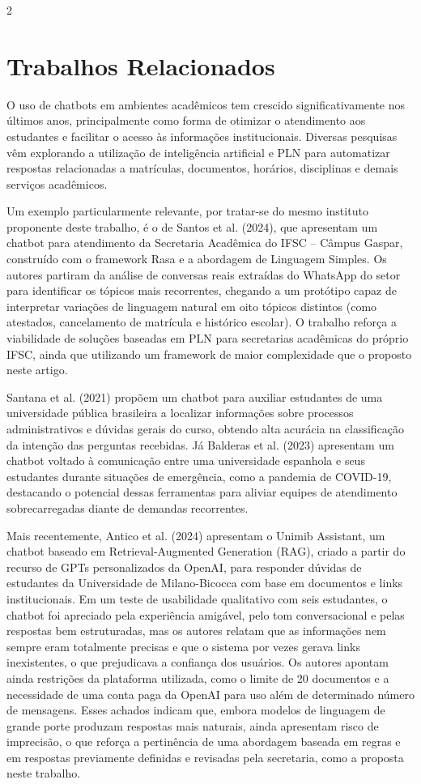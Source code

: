 \documentclass[10pt]{article}
\begin{document}
\begin{multicols}{2}
\section{Trabalhos Relacionados}\label{sec:trabalhos}

O uso de chatbots em ambientes acadêmicos tem crescido significativamente
nos últimos anos, principalmente como forma de otimizar o atendimento aos
estudantes e facilitar o acesso às informações institucionais. Diversas
pesquisas vêm explorando a utilização de inteligência artificial e PLN
para automatizar respostas relacionadas a matrículas, documentos,
horários, disciplinas e demais serviços acadêmicos.

Um exemplo particularmente relevante, por tratar-se do mesmo instituto
proponente deste trabalho, é o de Santos et al. (2024), que apresentam um
chatbot para atendimento da Secretaria Acadêmica do IFSC -- Câmpus
Gaspar, construído com o framework Rasa e a abordagem de Linguagem
Simples. Os autores partiram da análise de conversas reais extraídas do
WhatsApp do setor para identificar os tópicos mais recorrentes, chegando
a um protótipo capaz de interpretar variações de linguagem natural em
oito tópicos distintos (como atestados, cancelamento de matrícula e
histórico escolar). O trabalho reforça a viabilidade de soluções baseadas
em PLN para secretarias acadêmicas do próprio IFSC, ainda que utilizando
um framework de maior complexidade que o proposto neste artigo.

Santana et al. (2021) propõem um chatbot para auxiliar estudantes de uma
universidade pública brasileira a localizar informações sobre processos
administrativos e dúvidas gerais do curso, obtendo alta acurácia na
classificação da intenção das perguntas recebidas. Já Balderas et al.
(2023) apresentam um chatbot voltado à comunicação entre uma
universidade espanhola e seus estudantes durante situações de
emergência, como a pandemia de COVID-19, destacando o potencial dessas
ferramentas para aliviar equipes de atendimento sobrecarregadas diante de
demandas recorrentes.

Mais recentemente, Antico et al. (2024) apresentam o Unimib Assistant,
um chatbot baseado em Retrieval-Augmented Generation (RAG), criado a
partir do recurso de GPTs personalizados da OpenAI, para responder
dúvidas de estudantes da Universidade de Milano-Bicocca com base em
documentos e links institucionais. Em um teste de usabilidade qualitativo
com seis estudantes, o chatbot foi apreciado pela experiência amigável,
pelo tom conversacional e pelas respostas bem estruturadas, mas os
autores relatam que as informações nem sempre eram totalmente precisas e
que o sistema por vezes gerava links inexistentes, o que prejudicava a
confiança dos usuários. Os autores apontam ainda restrições da plataforma
utilizada, como o limite de 20 documentos e a necessidade de uma conta
paga da OpenAI para uso além de determinado número de mensagens. Esses
achados indicam que, embora modelos de linguagem de grande porte
produzam respostas mais naturais, ainda apresentam risco de imprecisão,
o que reforça a pertinência de uma abordagem baseada em regras e em
respostas previamente definidas e revisadas pela secretaria, como a
proposta neste trabalho.


\end{multicols}
\end{document}
